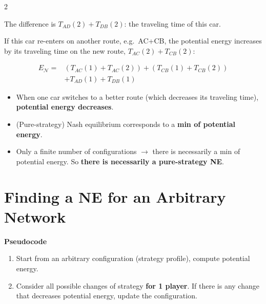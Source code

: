 \documentclass[a4paper,9pt]{extarticle}
\begin{document}
\begin{multicols}{2}
\begin{example}
The difference is $T_{AD}(2) + T_{DB}(2)$: the traveling time of this car.

If this car re-enters on another route, e.g.\ AC+CB, the potential energy increases by its
traveling time on the new route, $T_{AC}(2) + T_{CB}(2)$:

\begin{align*}
E_{\mathcal{N}} ={}& (T_{AC}(1) + T_{AC}(2)) + (T_{CB}(1) + T_{CB}(2)) \\
&+ T_{AD}(1) + T_{DB}(1)
\end{align*}

\end{example}


\begin{important}

\begin{itemize}

\item When one car switches to a better route (which decreases its traveling time),
\textbf{potential energy decreases}.

\item (Pure-strategy) Nash equilibrium corresponds to a \textbf{min of potential energy}.

\item Only a finite number of configurations $\rightarrow$ there is necessarily a min of
potential energy. So \textbf{there is necessarily a pure-strategy NE}.

\end{itemize}

\end{important}



\section{Finding a NE for an Arbitrary Network}


\begin{summary}

\textbf{Pseudocode}

\begin{enumerate}

\item Start from an arbitrary configuration (strategy profile), compute potential energy.

\item Consider all possible changes of strategy \textbf{for 1 player}. If there is any change
that decreases potential energy, update the configuration.


\end{enumerate}
\end{summary}
\end{multicols}
\end{document}

